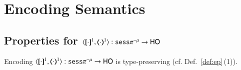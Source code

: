 \section{Encoding Semantics}



\subsection{Properties for $\encod{\cdot}{\cdot}{1}: \sessp^{-\mu} \to \HO$}
\label{app:enc_sesspnr_to_ho}

\begin{proposition}\rm
	\label{app:enc_sesspnr_to_ho_typing}
	Encoding $\encod{\cdot}{\cdot}{1}: \sessp^{-\mu} \to \HO$  is type-preserving (cf. Def.~\ref{def:ep}\,(1)).\rm
\end{proposition}


